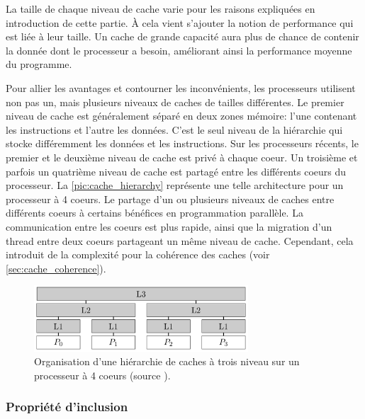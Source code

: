     La taille de chaque niveau de cache varie pour les raisons expliquées en introduction de cette partie. À cela vient s'ajouter la notion de performance qui est liée à leur taille. Un cache de grande capacité aura plus de chance de contenir la donnée dont le processeur a besoin, améliorant ainsi la performance moyenne du programme. 
    
    
    Pour allier les avantages et contourner les inconvénients, les processeurs utilisent non pas un, mais plusieurs niveaux de caches de tailles différentes.
    Le premier niveau de cache est généralement séparé en deux zones mémoire: l'une contenant les instructions et l'autre les données. C'est le seul niveau de la hiérarchie qui stocke différemment les données et les instructions. Sur les processeurs récents, le premier et le deuxième niveau de cache est privé à chaque coeur. Un troisième et parfois un quatrième niveau de cache est partagé entre les différents coeurs du processeur. La \autoref{pic:cache_hierarchy} représente une telle architecture pour un processeur à 4 coeurs. Le partage d'un ou plusieurs niveaux de caches entre différents coeurs à certains bénéfices en programmation parallèle. La communication entre les coeurs est plus rapide, ainsi que la migration d'un thread entre deux coeurs partageant un même niveau de cache. Cependant, cela introduit de la complexité pour la cohérence des caches (voir \autoref{sec:cache_coherence}).
    
    
    \begin{figure}
        \center
        \includegraphics[width=8cm]{images/cache_hierarchy.png}
        \caption{\label{pic:cache_hierarchy} Organisation d'une hiérarchie de caches à trois niveau sur un processeur à 4 coeurs (source \cite{putigny2014benchmark}).}
    \end{figure}
    
    
        
        
    \subsubsection{Propriété d'inclusion}
        
